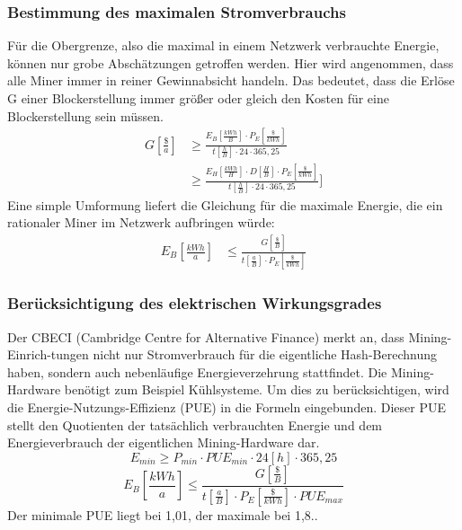 \documentclass[12pt]{article}
\begin{document}
\subsubsection{Bestimmung des maximalen Stromverbrauchs}
Für die Obergrenze, also die maximal in einem Netzwerk verbrauchte Energie, können nur grobe Abschätzungen getroffen werden. Hier wird angenommen, dass alle Miner immer in reiner Gewinnabsicht handeln. Das bedeutet, dass die Erlöse G einer Blockerstellung immer größer oder gleich den Kosten für eine Blockerstellung sein müssen.
\begin{align*}
    G\left[\frac{\$}{a}\right]&\geq \frac{E_B\left[\frac{kWh}{B}\right]\cdot P_E\left[\frac{\$}{kWh}\right]}{t \left[\frac{h}{B}\right]\cdot 24\cdot 365,25}\\
    &\geq \frac{E_H\left[\frac{kWh}{H}\right]\cdot D\left[\frac{H}{B}\right]\cdot P_E\left[\frac{\$}{kWh}\right]}{t \left[\frac{h}{B}\right]\cdot 24\cdot 365,25}]
\end{align*}
Eine simple Umformung liefert die Gleichung für die maximale Energie, die ein rationaler Miner im Netzwerk aufbringen würde:
\begin{align*}
    E_B\left[\frac{kWh}{a}\right]&\leq\frac{G\left[\frac{\$}{B}\right]}{t \left[\frac{a}{B}\right]\cdot P_E\left[\frac{\$}{kWh}\right]}
\end{align*}

\subsubsection{Berücksichtigung des elektrischen Wirkungsgrades}
Der CBECI (Cambridge Centre for Alternative Finance) merkt an, dass Mining-Einrich-tungen nicht nur Stromverbrauch für die eigentliche Hash-Berechnung haben, sondern auch nebenläufige Energieverzehrung stattfindet. Die Mining-Hardware benötigt zum Beispiel Kühlsysteme. Um dies zu berücksichtigen, wird die Energie-Nutzungs-Effizienz (PUE) in die Formeln eingebunden. Dieser PUE stellt den Quotienten der tatsächlich verbrauchten Energie und dem Energieverbrauch der eigentlichen Mining-Hardware dar.
\[E_{min}\geq P_{min}\cdot PUE_{min}\cdot 24[h]\cdot 365,25\]
\[E_B\left[\frac{kWh}{a}\right]\leq\frac{G\left[\frac{\$}{B}\right]}{t \left[\frac{a}{B}\right]\cdot P_E\left[\frac{\$}{kWh}\right]\cdot PUE_{max}}\]
Der minimale PUE liegt bei 1,01, der maximale bei 1,8..
\end{document}
